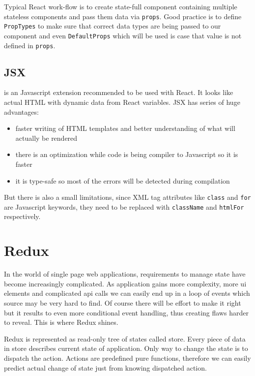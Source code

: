 Typical React work-flow is to create state-full component containing multiple stateless components and pass them data via \texttt{props}. Good practice is to define \texttt{PropTypes} to make sure that correct data types are being passed to our component and even \texttt{DefaultProps} which will be used is case that value is not defined in \texttt{props}. 

\subsection{JSX} is an Javascript extension recommended to be used with React. It looks like actual HTML with dynamic data from React variables. JSX has series of huge advantages:
\begin{itemize}
\item faster writing of HTML templates and better understanding of what will actually be rendered
\item there is an optimization while code is being compiler to Javascript so it is faster 
\item it is type-safe so most of the errors will be detected during compilation
\end{itemize}  
But there is also a small limitations, since XML tag attributes like \texttt{class} and \texttt{for} are Javascript keywords, they need to be replaced with \texttt{className} and \texttt{htmlFor} respectively. 

\section{Redux}
In the world of single page web applications, requirements to manage state have become increasingly complicated. As application gains more complexity, more ui elements and complicated api calls we can easily end up in a loop of events which source may be very hard to find. Of course there will be effort to make it right but it results to even more conditional event handling, thus creating flaws harder to reveal. This is where Redux shines.

Redux is represented as read-only tree of states called store. Every piece of data in store describes current state of application. Only way to change the state is to dispatch the action. Actions are predefined pure functions, therefore we can easily predict actual change of state just from knowing dispatched action.

